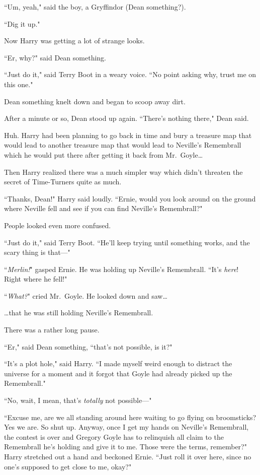 ``Um, yeah," said the boy, a Gryffindor (Dean something?).

``Dig it up."

Now Harry was getting a lot of strange looks.

``Er, why?" said Dean something.

``Just do it," said Terry Boot in a weary voice. ``No point asking why, trust me on this one."

Dean something knelt down and began to scoop away dirt.

After a minute or so, Dean stood up again. ``There's nothing there," Dean said.

Huh. Harry had been planning to go back in time and bury a treasure map that would lead to another treasure map that would lead to Neville's Remembrall which he would put there after getting it back from Mr.~Goyle{\ldots}

Then Harry realized there was a much simpler way which didn't threaten the secret of Time-Turners quite as much.

``Thanks, Dean!" Harry said loudly. ``Ernie, would you look around on the ground where Neville fell and see if you can find Neville's Remembrall?"

People looked even more confused.

``Just do it," said Terry Boot. ``He'll keep trying until something works, and the scary thing is that—"

``\emph{Merlin!}" gasped Ernie. He was holding up Neville's Remembrall. ``It's \emph{here}! Right where he fell!"

``\emph{What?}" cried Mr.~Goyle. He looked down and saw{\ldots}

{\ldots}that he was still holding Neville's Remembrall.

There was a rather long pause.

``Er," said Dean something, ``that's not possible, is it?"

``It's a plot hole," said Harry. ``I made myself weird enough to distract the universe for a moment and it forgot that Goyle had already picked up the Remembrall."

``No, wait, I mean, that's \emph{totally} not possible—"

``Excuse me, are we all standing around here waiting to go flying on broomsticks? Yes we are. So shut up. Anyway, once I get my hands on Neville's Remembrall, the contest is over and Gregory Goyle has to relinquish all claim to the Remembrall he's holding and give it to me. Those were the terms, remember?" Harry stretched out a hand and beckoned Ernie. ``Just roll it over here, since no one's supposed to get close to me, okay?"

